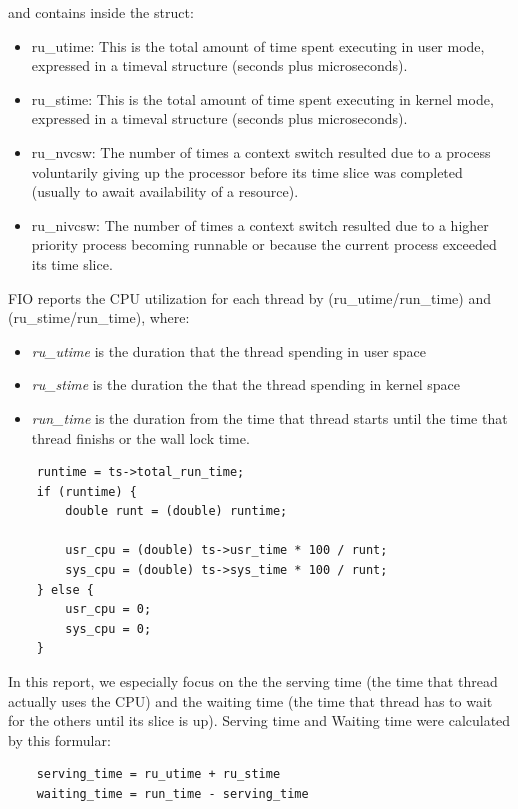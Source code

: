 \documentclass{acmsig}
\begin{document}
and contains inside the struct:

\begin{itemize}
  \item ru\_utime: This is the total amount of time spent executing in user mode, expressed in a timeval structure (seconds plus microseconds).
  \item ru\_stime: This is the total amount of time spent executing in kernel mode, expressed in a timeval structure (seconds plus microseconds).
  \item ru\_nvcsw: The number of times a context switch resulted due to a process voluntarily giving up the processor before its time slice was completed (usually to await availability of a resource).
  \item ru\_nivcsw: The number of times a context switch resulted due to a higher priority process becoming runnable or because the current process exceeded its time slice.
\end{itemize}

FIO reports the CPU utilization for each thread by (ru\_utime/run\_time) and (ru\_stime/run\_time), where:

\begin{itemize}
  \item \textit{ru\_utime} is the duration that the thread spending in user space
  \item \textit{ru\_stime} is the duration the that the thread spending in kernel space
  \item \textit{run\_time} is the duration from the time that thread starts until the time that thread finishs or the wall lock time.
\end{itemize}

\begin{lstlisting}
    runtime = ts->total_run_time;
    if (runtime) {
        double runt = (double) runtime;

        usr_cpu = (double) ts->usr_time * 100 / runt;
        sys_cpu = (double) ts->sys_time * 100 / runt;
    } else {
        usr_cpu = 0;
        sys_cpu = 0;
    }
\end{lstlisting}
In this report, we especially focus on the the serving time (the time that thread actually uses the CPU) and the waiting time (the time that thread has to wait for the others until its slice is up). Serving time and Waiting time were calculated by this formular:
\begin{lstlisting}
    serving_time = ru_utime + ru_stime
    waiting_time = run_time - serving_time
\end{lstlisting}
\end{document}
